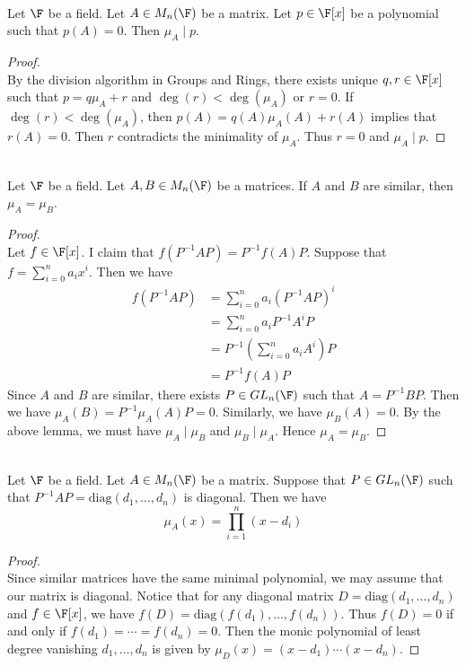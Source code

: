 \documentclass[a4paper]{article}
\begin{document}
\begin{lmm}{}{}\\
Let $\F$ be a field. Let $A\in M_n(\F)$ be a matrix. Let $p\in\F[x]$ be a polynomial such that $p(A)=0$. Then $\mu_A\;|\;p$. 
\begin{proof}\\
By the division algorithm in Groups and Rings, there exists unique $q,r\in\F[x]$ such that $p=q\mu_A+r$ and $\deg(r)<\deg(\mu_A)$ or $r=0$. If $\deg(r)<\deg(\mu_A)$, then $p(A)=q(A)\mu_A(A)+r(A)$ implies that $r(A)=0$. Then $r$ contradicts the minimality of $\mu_A$. Thus $r=0$ and $\mu_A\;|\;p$. 
\end{proof}
\end{lmm}

\begin{prp}{}{}\\
Let $\F$ be a field. Let $A,B\in M_n(\F)$ be a matrices. If $A$ and $B$ are similar, then $\mu_A=\mu_B$. 
\begin{proof}\\
Let $f\in\F[x]$. I claim that $f(P^{-1}AP)=P^{-1}f(A)P$. Suppose that $f=\sum_{i=0}^na_ix^i$. Then we have 
\begin{align*}
f(P^{-1}AP)&=\sum_{i=0}^na_i(P^{-1}AP)^i\\
&=\sum_{i=0}^na_iP^{-1}A^iP\\
&=P^{-1}\left(\sum_{i=0}^na_iA^i\right)P\\
&=P^{-1}f(A)P
\end{align*}
Since $A$ and $B$ are similar, there exists $P\in GL_n(\F)$ such that $A=P^{-1}BP$. Then we have $\mu_A(B)=P^{-1}\mu_A(A)P=0$. Similarly, we have $\mu_B(A)=0$. By the above lemma, we must have $\mu_A\;|\;\mu_B$ and $\mu_B\;|\;\mu_A$. Hence $\mu_A=\mu_B$. 
\end{proof}
\end{prp}

\begin{prp}{}{}\\
Let $\F$ be a field. Let $A\in M_n(\F)$ be a matrix. Suppose that $P\in GL_n(\F)$ such that $P^{-1}AP=\text{diag}(d_1,\dots,d_n)$ is diagonal. Then we have $$\mu_A(x)=\prod_{i=1}^n(x-d_i)$$
\begin{proof}\\
Since similar matrices have the same minimal polynomial, we may assume that our matrix is diagonal. Notice that for any diagonal matrix $D=\text{diag}(d_1,\dots,d_n)$ and $f\in\F[x]$, we have $f(D)=\text{diag}(f(d_1),\dots,f(d_n))$. Thus $f(D)=0$ if and only if $f(d_1)=\cdots=f(d_n)=0$. Then the monic polynomial of least degree vanishing $d_1,\dots,d_n$ is given by $\mu_D(x)=(x-d_1)\cdots(x-d_n)$. 
\end{proof}
\end{prp}
\end{document}
